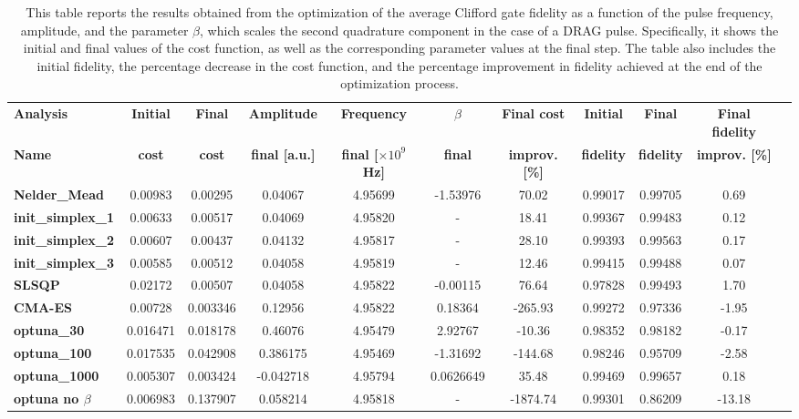 \begin{table}
    \centering
    \begin{tabular}{lcccccccccc}
        \toprule
        \textbf{Analysis} & \textbf{Initial} & \textbf{Final} & \textbf{Amplitude} & \textbf{Frequency} & \textbf{$\beta$} & \textbf{Final cost} & \textbf{Initial} & \textbf{Final} & \textbf{Final fidelity} \\
        \textbf{Name} & \textbf{cost} & \textbf{cost} & \textbf{final [a.u.]} & \textbf{final [$\times10^9$ Hz]} & \textbf{final} & \textbf{improv. [\%]} & \textbf{fidelity} & \textbf{fidelity} & \textbf{improv. [\%]} \\
        \midrule
        \textbf{Nelder\_Mead} & 0.00983 & 0.00295 & 0.04067 & 4.95699 & -1.53976 & 70.02 & 0.99017 & 0.99705 & 0.69 \\
        \textbf{init\_simplex\_1} & 0.00633 & 0.00517 & 0.04069 & 4.95820 & - & 18.41 & 0.99367 & 0.99483 & 0.12 \\
        \textbf{init\_simplex\_2} & 0.00607 & 0.00437 & 0.04132 & 4.95817 & - & 28.10 & 0.99393 & 0.99563 & 0.17 \\
        \textbf{init\_simplex\_3} & 0.00585 & 0.00512 & 0.04058 & 4.95819 & - & 12.46 & 0.99415 & 0.99488 & 0.07 \\
        \textbf{SLSQP} & 0.02172 & 0.00507 & 0.04058 & 4.95822 & -0.00115 & 76.64 & 0.97828 & 0.99493 & 1.70 \\
        \textbf{CMA-ES} & 0.00728 & 0.003346 & 0.12956 & 4.95822 & 0.18364 & -265.93 & 0.99272 & 0.97336 & -1.95 \\
        \textbf{optuna\_30} & 0.016471 & 0.018178 & 0.46076 & 4.95479 & 2.92767 & -10.36 & 0.98352 & 0.98182 & -0.17\\
        \textbf{optuna\_100} & 0.017535 & 0.042908 &  0.386175 & 4.95469 & -1.31692 & -144.68 & 0.98246 & 0.95709 & -2.58\\
        \textbf{optuna\_1000} & 0.005307 & 0.003424 & -0.042718 & 4.95794 & 0.0626649 & 35.48 & 0.99469 & 0.99657 & 0.18\\
        \textbf{optuna no $\beta$} & 0.006983 & 0.137907 & 0.058214 & 4.95818 & - & -1874.74 & 0.99301 & 0.86209 & -13.18\\
        \bottomrule
    \end{tabular}
    \caption{This table reports the results obtained from the optimization of the average Clifford gate fidelity as a function of the pulse frequency, amplitude, and the parameter $\beta$, which scales the second quadrature component in the case of a DRAG pulse.
    Specifically, it shows the initial and final values of the cost function, as well as the corresponding parameter values at the final step. 
    The table also includes the initial fidelity, the percentage decrease in the cost function, and the percentage improvement in fidelity achieved at the end of the optimization process.}
    \label{tab:final_values}
\end{table}